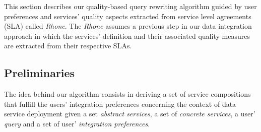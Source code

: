 This section describes our quality-based query rewriting algorithm guided by user preferences and services' quality aspects extracted from service level agreements (SLA) called \textit{Rhone}. The \textit{Rhone} assumes a previous step in our data integration approach in which the services' definition and their associated quality measures are extracted from their respective SLAs.
%

\subsection{Preliminaries}

The idea behind our algorithm consists in deriving a set of service compositions that fulfill the users' integration preferences concerning the context of data service deployment given a set \textit{abstract services}, a set of \textit{concrete services}, a user' \textit{query} and a set of user' \textit{integration preferences}.
%
%
